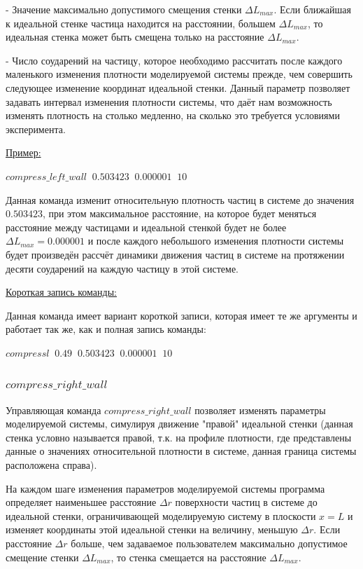 \documentclass{article}
\begin{document}
- Значение максимально допустимого смещения стенки $ \Delta L_{max} $. Если ближайшая к идеальной стенке частица находится на расстоянии, большем $ \Delta L_{max} $, то идеальная стенка может быть смещена только на расстояние $ \Delta L_{max} $.

- Число соударений на частицу, которое необходимо рассчитать после каждого маленького изменения плотности моделируемой системы прежде, чем совершить следующее изменение координат идеальной стенки. Данный параметр позволяет задавать интервал изменения плотности системы, что даёт нам возможность изменять плотность на столько медленно, на сколько  это требуется условиями эксперимента.

\uline{Пример:}

$ compress\_left\_wall \;\; 0.503423 \;\; 0.000001 \;\; 10 $

Данная команда изменит относительную плотность частиц в системе до значения $ 0.503423 $, при этом максимальное расстояние, на которое будет меняться расстояние между частицами и идеальной стенкой будет не более $ \Delta L_{max} = 0.000001 $ и после каждого небольшого изменения плотности системы будет произведён рассчёт динамики движения частиц в системе на протяжении десяти соударений на каждую частицу в этой системе.

\uline{Короткая запись команды:}

Данная команда имеет вариант короткой записи, которая имеет те же аргументы и работает так же, как и полная запись команды:

$ compressl \;\; 0.49 \;\; 0.503423 \;\; 0.000001 \;\; 10 $

\subsubsection{$ compress\_right\_wall $}
Управляющая команда $ compress\_right\_wall $ позволяет изменять параметры моделируемой системы, симулируя движение "правой" идеальной стенки (данная стенка условно называется правой, т.к. на профиле плотности, где представлены данные о значениях относительной плотности в системе, данная граница системы расположена справа).

На каждом шаге изменения параметров моделируемой системы программа определяет наименьшее расстояние $ \Delta r $ поверхности частиц в системе до идеальной стенки, ограничивающей моделируемую систему в плоскости $ x = L $ и изменяет координаты этой идеальной стенки на величину, меньшую $ \Delta r $. Если расстояние $ \Delta r $ больше, чем задаваемое пользователем максимально допустимое смещение стенки $ \Delta L_{max} $, то стенка смещается на расстояние $ \Delta L_{max} $.
\end{document}

